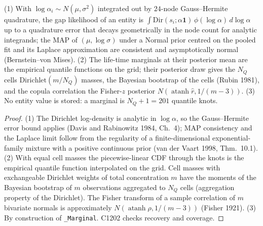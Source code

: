 \begin{proposition}\label{prop:tspost}
(1) With $\log\alpha_i\sim N(\mu,\sigma^2)$ integrated out by $24$-node Gauss--Hermite quadrature, the gap likelihood
of an entity is $\int\mathrm{Dir}(s_i;\alpha\mathbf 1)\,\phi(\log\alpha)\,d\log\alpha$ up to a quadrature error that
decays geometrically in the node count for analytic integrands; the MAP of $(\mu,\log\sigma)$ under a Normal prior
centred on the pooled fit and its Laplace approximation are consistent and asymptotically normal (Bernstein--von
Mises). (2) The life-time marginals at their posterior mean are the empirical quantile functions on the grid; their
posterior draw gives the $N_Q$ cells $\mathrm{Dirichlet}(m/N_Q)$ masses, the Bayesian bootstrap of the cells (Rubin
1981), and the copula correlation the Fisher-$z$ posterior $N(\operatorname{atanh}\hat r,1/(m-3))$.
(3) No entity value is stored: a marginal is $N_Q+1=201$ quantile knots.
\end{proposition}
\begin{proof}
(1) The Dirichlet log-density is analytic in $\log\alpha$, so the Gauss--Hermite error bound applies (Davis and
Rabinowitz 1984, Ch.~4); MAP consistency and the Laplace limit follow from the regularity of a finite-dimensional
exponential-family mixture with a positive continuous prior (van der Vaart 1998, Thm.~10.1). (2) With equal cell masses
the piecewise-linear CDF through the knots is the empirical quantile function interpolated on the grid. Cell masses
with exchangeable Dirichlet weights of total concentration $m$ have the moments of the Bayesian bootstrap of $m$
observations aggregated to $N_Q$ cells (aggregation property of the Dirichlet). The Fisher transform of a sample
correlation of $m$ bivariate normals is approximately $N(\operatorname{atanh}\rho,1/(m-3))$ (Fisher 1921). (3) By
construction of \texttt{\_Marginal}. C1202 checks recovery and coverage.
\end{proof}

